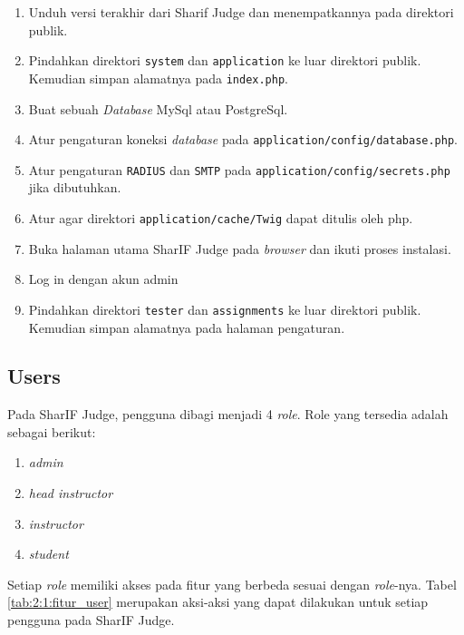 \begin{enumerate}
	\item Unduh versi terakhir dari Sharif Judge dan menempatkannya pada direktori publik.
	\item Pindahkan direktori \texttt{system} dan \texttt{application} ke luar direktori publik. Kemudian simpan alamatnya pada \texttt{index.php}.
	\item Buat sebuah \textit{Database} MySql atau PostgreSql.
	\item Atur pengaturan koneksi \textit{database} pada \texttt{application/config/database.php}.
	\item Atur pengaturan \texttt{RADIUS} dan \texttt{SMTP} pada \texttt{application/config/secrets.php} jika dibutuhkan.
	\item Atur agar direktori \texttt{application/cache/Twig} dapat ditulis oleh php.
	\item Buka halaman utama SharIF Judge pada \textit{browser} dan ikuti proses instalasi.
	\item Log in dengan akun admin
	\item Pindahkan direktori \texttt{tester} dan \texttt{assignments} ke luar direktori publik. Kemudian simpan alamatnya pada halaman pengaturan.
\end{enumerate}

\newpage

\subsection{Users}
\label{sub:2:1:users}

Pada SharIF Judge, pengguna dibagi menjadi 4 \textit{role}. Role yang tersedia adalah sebagai berikut:

\begin{enumerate}
	\item \textit{admin}
	\item \textit{head instructor}
	\item \textit{instructor}
	\item \textit{student}
\end{enumerate}

Setiap \textit{role} memiliki akses pada fitur yang berbeda sesuai dengan \textit{role}-nya. Tabel \ref{tab:2:1:fitur_user} merupakan aksi-aksi yang dapat dilakukan untuk setiap pengguna pada SharIF Judge.

